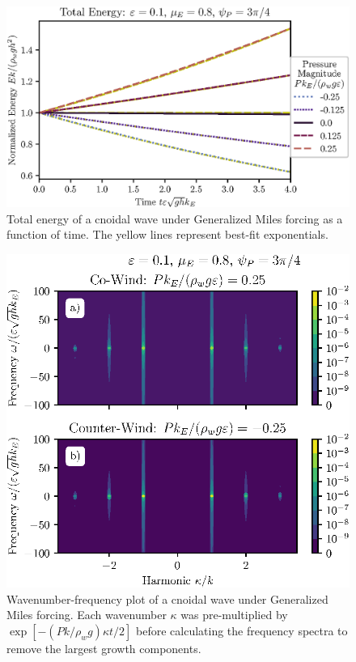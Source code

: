 \documentclass{jfm}
\begin{document}
\begin{figure}
  \centering
  \includegraphics{Total-Energy-GM.eps}
  \caption{
    Total energy of a cnoidal wave under Generalized Miles forcing as a
    function of time. The yellow lines represent best-fit exponentials.
  }
\end{figure}

\begin{figure}
  \centering
  \includegraphics{Double-Power-Spectrum-GM.eps}
  \caption{
    Wavenumber-frequency plot of a cnoidal wave under Generalized Miles
    forcing.
    Each wavenumber $\kappa$ was pre-multiplied by $\exp[-(P k/\rho_w
    g) \kappa t/2]$ before calculating the frequency spectra to remove
    the largest growth components.
  }
\end{figure}
\end{document}
